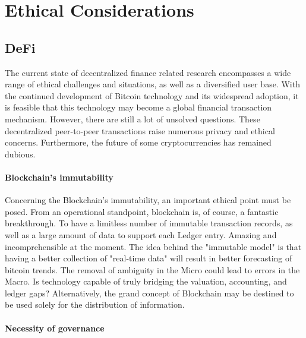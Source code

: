\documentclass[10pt,twocolumn]{article}
\begin{document}
\section{Ethical Considerations}

\subsection{DeFi}
The current state of decentralized finance related research encompasses a wide range of ethical challenges and situations, as well as a diversified user base. With the continued development of Bitcoin technology and its widespread adoption, it is feasible that this technology may become a global financial transaction mechanism. However, there are still a lot of unsolved questions. These decentralized peer-to-peer transactions raise numerous privacy and ethical concerns. Furthermore, the future of some cryptocurrencies has remained dubious.\cite{FabianDeFi}
\paragraph{Blockchain's immutability}
Concerning the Blockchain's immutability, an important ethical point must be posed. From an operational standpoint, blockchain is, of course, a fantastic breakthrough. To have a limitless number of immutable transaction records, as well as a large amount of data to support each Ledger entry. Amazing and incomprehensible at the moment. The idea behind the "immutable model" is that having a better collection of "real-time data" will result in better forecasting of bitcoin trends. The removal of ambiguity in the Micro could lead to errors in the Macro. Is technology capable of truly bridging the valuation, accounting, and ledger gaps? Alternatively, the grand concept of Blockchain may be destined to be used solely for the distribution of information.
\paragraph{Necessity of governance}
\end{document}
